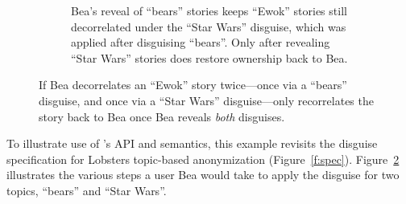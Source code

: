 \begin{figure}
\begin{subfigure}[t]{.47\columnwidth}
  \caption{Bea's reveal of ``bears'' stories keeps ``Ewok'' stories still
    decorrelated under the ``Star Wars'' disguise, which was applied after
    disguising ``bears''. Only after revealing ``Star Wars'' stories does \sys
    restore ownership back to Bea.}
\label{f:composition-hl-ooo}
\end{subfigure}
    \caption[\sys only reveals the original state of data disguised multiple times once
    all disguises applied to the data have been revealed.]{
        If Bea decorrelates an ``Ewok'' story twice---once via a ``bears''
        disguise, and once via a ``Star Wars'' disguise---\sys only recorrelates
        the story back to Bea once Bea reveals \emph{both} disguises.}
\label{f:composition-hl}
\end{figure}

%
To illustrate use of \sys's API and semantics, this example revisits the disguise 
specification for Lobsters topic-based anonymization (Figure~\ref{f:spec}). 
Figure~\ref{f:composition-hl} illustrates the various steps a user Bea would
take to apply the disguise for two topics, ``bears'' and ``Star Wars''.

